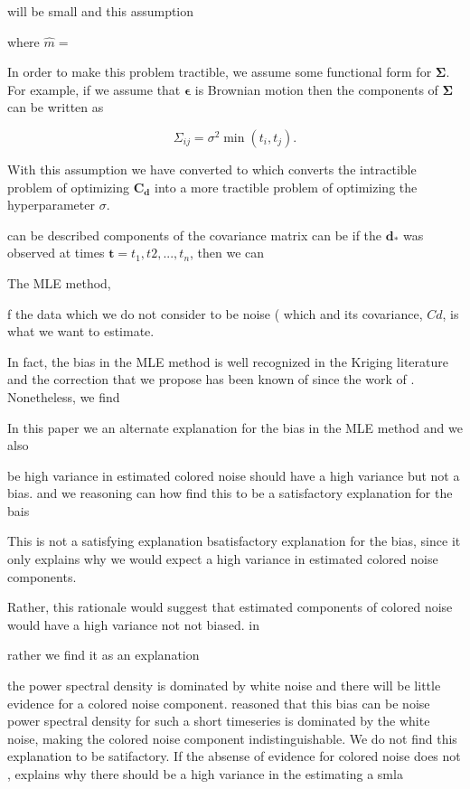\documentclass[10pt,a4paper]{article}
\begin{document}
will be small and this assumption      

where $\hat{m}=$  

In order to make this problem tractible, we assume some functional form for $\mathbf{\Sigma}$. For example, if we assume that $\mathbf{\epsilon}$ is Brownian motion then the components of $\mathbf{\Sigma}$ can be written as

\begin{equation}\label{RandomWalk}
  \Sigma_{ij} = \sigma^2\min(t_i,t_j).
\end{equation}

With this assumption we have converted to 
which converts the intractible problem of optimizing $\mathbf{C_d}$ into a more tractible problem of optimizing the hyperparameter $\sigma$. 

can be described  components of the covariance matrix can be   if the $\mathbf{d_*}$ was observed at times $\mathbf{t} = {t_1,t2,...,t_n}$, then we can      

The MLE method, 

  f the data which we do not consider to be noise ( which     and its covariance, $Cd$, is what we want to estimate.  

In fact, the bias in the MLE method is well recognized in the Kriging literature \citep[e.g][]{Cressie1992} and the correction that we propose has been known of since the work of \citet{Patterson1971}. Nonetheless, we find         

In this paper we an alternate explanation for the bias in the MLE method and we also     

be high variance in estimated colored noise should have a high variance but not a bias.   and we reasoning can how find this to be a satisfactory explanation for the bais

This is not a satisfying explanation bsatisfactory explanation for the bias, since it only explains why we would expect a high variance in estimated colored noise components.

Rather, this rationale would suggest that estimated components of colored noise would have a high variance not not biased. in 

rather we find it as an explanation    

the power spectral density is dominated by white noise and there will be little evidence for a colored noise component.   \citet{Langbein2012} reasoned that this bias can be noise power spectral density for such a short timeseries is dominated by the white noise, making the colored noise component indistinguishable.  We do not find this explanation to be satifactory. If the absense of evidence for colored noise does not ,  explains why there should be a high variance in the  estimating a smla   
\end{document}
